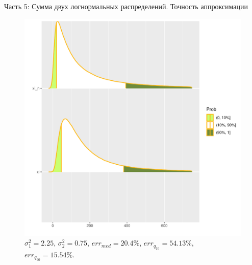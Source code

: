 \documentclass[ucs, notheorems, handout]{beamer}
\begin{document}
	\begin{frame}{Часть 5: Сумма двух логнормальных распределений. Точность аппроксимации }
		
		\begin{figure}[h]
			\begin{center}
				\begin{minipage}[h]{0.53\linewidth}
					\includegraphics[width=1\linewidth]{img/sr2.pdf}
					\caption{$\sigma_{1}^{2} = 2.25$, $\sigma_{2}^{2} = 0.75$, $err_{med} = 20.4\%$,  $err_{q_{10}} = 54.13\%$,  $err_{q_{90}} = 15.54\%$. } %
					\label{ris7} %
				\end{minipage}
				
			\end{center}
		\end{figure}
	
	\end{frame}
	
\end{document}

